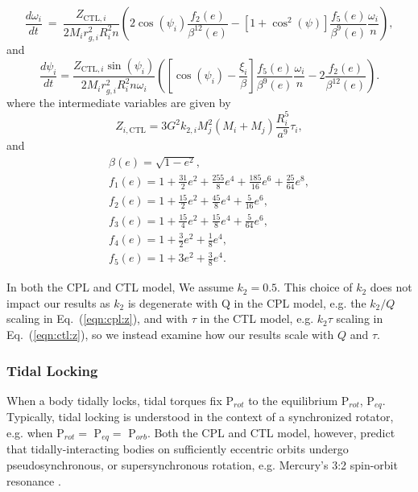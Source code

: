 \documentclass[twocolumn]{aastex61}
\begin{document}
\begin{equation}\label{eqn:ctl:omega}
  \frac{d\omega_i}{dt} \ = \ \frac{Z_{\mathrm{CTL},i}}{2 M_i r_{g,i}^2 
R_i^2 n} \left( 2 \cos(\psi_i) \frac{f_2(e)}{\beta^{12}(e)} - \left[ 1+\cos^2(\psi)
 \right] \frac{f_5(e)}{\beta^9(e)} 
\frac{\omega_i}{n} \right),  
\end{equation}
and
\begin{equation}\label{eqn:ctl:psi}
  \frac{d\psi_i}{dt} = \frac{Z_{\mathrm{CTL},i} \sin(\psi_i)}{2 M_i r_{g,i}^2 R_i^2 n \omega_i}\left( \left[ \cos(\psi_i) - \frac{\xi_i}{ \beta} \right] \frac{f_5(e)}{\beta^9(e)} \frac{\omega_i}{n} - 2 \frac{f_2(e)}{\beta^{12}(e)} \right).
\end{equation}
where the intermediate variables are given by 
\begin{equation}\label{eqn:ctl:z}
 Z_{i,\mathrm{CTL}} = 3 G^2 k_{2,i} M_j^2 (M_i+M_j) \frac{R_i^5}{a^9} \tau_i ,
\end{equation}
and 
\begin{equation}\label{eqn:ctl:f_e}
\begin{array}{l}
\beta(e) = \sqrt{1-e^2},\\
f_1(e) = 1 + \frac{31}{2} e^2 + \frac{255}{8} e^4 + \frac{185}{16} e^6 + \frac{25}{
64} e^8,\\
f_2(e) = 1 + \frac{15}{2} e^2 + \frac{45}{8} e^4 + \frac{5}{16} e^6,\\
f_3(e) = 1 + \frac{15}{4} e^2 + \frac{15}{8} e^4 + \frac{5}{64} e^6,\\
f_4(e) = 1 + \frac{3}{2} e^2 + \frac{1}{8} e^4,\\
f_5(e) = 1 + 3 e^2 + \frac{3}{8} e^4.
\end{array}
\end{equation}

In both the CPL and CTL model, We assume $k_2 = 0.5$. This choice of $k_2$ does not impact our results as $k_2$ is degenerate with Q in the CPL model, e.g. the $k_2/Q$ scaling in Eq.~(\ref{eqn:cpl:z}), and with $\tau$ in the CTL model, e.g. $k_2 \tau$ scaling in Eq.~(\ref{eqn:ctl:z}), so we instead examine how our results scale with $Q$ and $\tau$.

\subsubsection{Tidal Locking}

When a body tidally locks, tidal torques fix P$_{rot}$ to the equilibrium P$_{rot}$, P$_{eq}$.  Typically, tidal locking is understood in the context of a synchronized rotator, e.g. when P$_{rot} = $ P$_{eq} = $ P$_{orb}$. Both the CPL and CTL model, however, predict that tidally-interacting bodies on sufficiently eccentric orbits undergo pseudosynchronous, or supersynchronous rotation, e.g. Mercury's 3:2 spin-orbit resonance \citep[P$_{rot} = 2/3$ P$_{orb}$,][]{GoldreichPeale1966}.
\end{document}
